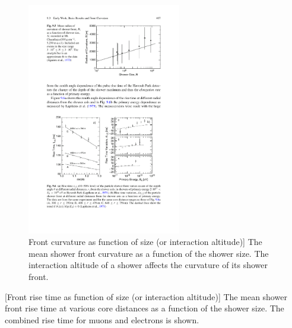 

\begin{figure}
    \centering
    \includegraphics[width=0.6\textwidth]
                    {plots/cosmic-rays/curvature_front}
    \caption{Front curvature as function of size (or interaction altitude)]
The mean shower front curvature as a function of the shower size. The interaction altitude of a shower affects the curvature of its shower front.}
    \label{fig:curvature_front}
\end{figure}

[Front rise time as function of size (or interaction altitude)]
The mean shower front rise time at various core distances as a function of the shower size. The combined rise time for muons and electrons is shown.


